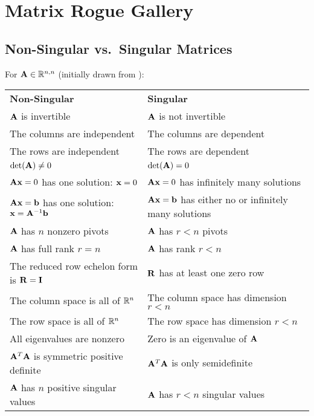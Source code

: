 \chapter{Matrix Rogue Gallery}

\section{Non-Singular vs.\ Singular Matrices}
For $\mathbf{A}\in\mathbb{R}^{n,n}$ (initially drawn from \citep[p.\ 574]{Strang2016}):
\begin{center}
\begin{tabular}{ll}
\textbf{Non-Singular}                           & \textbf{Singular}                        \\
$\mathbf{A}$ is invertible                             & $\mathbf{A}$ is not invertible                  \\
The columns are independent                     & The columns are dependent                \\
The rows are independent                        & The rows are dependent                   \\
$\det(\mathbf{A})\ne0$                                 & $\det(\mathbf{A})=0$                            \\
$\mathbf{A}\mathbf{x}=0$ has one solution: $\mathbf{x}=0$            & $\mathbf{A}\mathbf{x}=0$ has infinitely many solutions \\
$\mathbf{A}\mathbf{x}=\mathbf{b}$ has one solution: $\mathbf{x}=\mathbf{A}^{-1}\mathbf{b}$& $\mathbf{A}\mathbf{x}=\mathbf{b}$ has either no or infinitely many solutions \\
$\mathbf{A}$ has $n$ nonzero pivots                    & $\mathbf{A}$ has $r<n$ pivots                   \\
$\mathbf{A}$ has full rank $r=n$                       & $\mathbf{A}$ has rank $r<n$                     \\
The reduced row echelon form is $\mathbf{R}=\mathbf{I}$       & $\mathbf{R}$ has at least one zero row          \\
The column space is all of $\mathbb{R}^{n}$               & The column space has dimension $r<n$     \\
The row space is all of $\mathbb{R}^{n}$                  & The row space has dimension $r<n$        \\
All eigenvalues are nonzero                     & Zero is an eigenvalue of $\mathbf{A}$           \\
$\mathbf{A}^T\mathbf{A}$ is symmetric positive definite       & $\mathbf{A}^T\mathbf{A}$ is only semidefinite          \\
$\mathbf{A}$ has $n$ positive singular values          & $\mathbf{A}$ has $r<n$ singular values        
\end{tabular}
\end{center}

